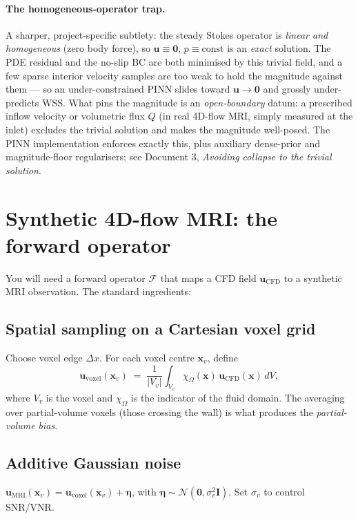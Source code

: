 \documentclass[11pt]{article}
\begin{document}
\paragraph{The homogeneous-operator trap.} A sharper, project-specific subtlety: the steady Stokes operator is \emph{linear and homogeneous} (zero body force), so $\mathbf{u}\equiv\mathbf{0},\,p\equiv\text{const}$ is an \emph{exact} solution. The PDE residual and the no-slip BC are both minimised by this trivial field, and a few sparse interior velocity samples are too weak to hold the magnitude against them --- so an under-constrained PINN slides toward $\mathbf{u}\to\mathbf{0}$ and grossly under-predicts WSS. What pins the magnitude is an \emph{open-boundary} datum: a prescribed inflow velocity or volumetric flux $Q$ (in real 4D-flow MRI, simply measured at the inlet) excludes the trivial solution and makes the magnitude well-posed. The PINN implementation enforces exactly this, plus auxiliary dense-prior and magnitude-floor regularisers; see Document 3, \emph{Avoiding collapse to the trivial solution}.

\section{Synthetic 4D-flow MRI: the forward operator}

You will need a forward operator $\mathcal{F}$ that maps a CFD field $\mathbf{u}_{\text{CFD}}$ to a synthetic MRI observation. The standard ingredients:

\subsection*{Spatial sampling on a Cartesian voxel grid}
Choose voxel edge $\Delta x$. For each voxel centre $\mathbf{x}_v$, define
\[
\mathbf{u}_{\text{voxel}}(\mathbf{x}_v) \;=\; \frac{1}{|V_v|}\int_{V_v} \chi_\Omega(\mathbf{x})\,\mathbf{u}_{\text{CFD}}(\mathbf{x}) \, dV,
\]
where $V_v$ is the voxel and $\chi_\Omega$ is the indicator of the fluid domain. The averaging over partial-volume voxels (those crossing the wall) is what produces the \emph{partial-volume bias}.

\subsection*{Additive Gaussian noise}
$\mathbf{u}_{\text{MRI}}(\mathbf{x}_v) = \mathbf{u}_{\text{voxel}}(\mathbf{x}_v) + \boldsymbol{\eta}$, with $\boldsymbol{\eta} \sim \mathcal{N}(\mathbf{0}, \sigma_v^2 \mathbf{I})$. Set $\sigma_v$ to control SNR/VNR.
\end{document}
